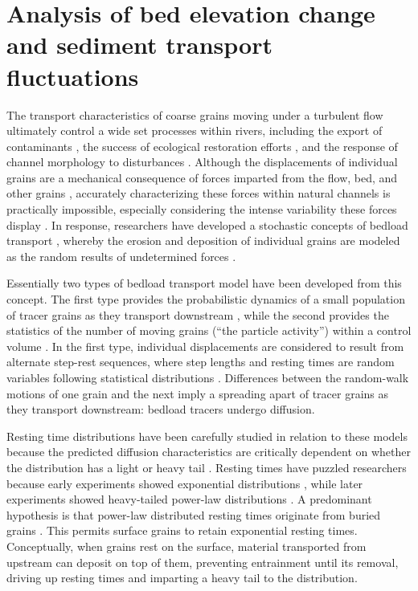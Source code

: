 
\chapter{Analysis of bed elevation change and sediment transport fluctuations}
\label{ch:ch3}

The transport characteristics of coarse grains moving under a turbulent flow ultimately control a wide set processes within rivers, including the export of contaminants \citep{Malmon2005,Macklin2006}, the success of ecological restoration efforts \citep{Gaeuman2017}, and the response of channel morphology to disturbances \citep{Hassan2017}.
Although the displacements of individual grains are a mechanical consequence of forces imparted from the flow, bed, and other grains \citep{Wiberg1985, Vowinckel2014,Gonzalez2017}, accurately characterizing these forces within natural channels is practically impossible, especially considering the intense variability these forces display \citep{Schmeeckle2007,Celik2010, Dwivedi2011}.
In response, researchers have developed a stochastic concepts of bedload transport \citep{Einstein1937}, whereby the erosion and deposition of individual grains are modeled as the random results of undetermined forces \citep{Einstein1950,Paintal1971,Ancey2006}.

Essentially two types of bedload transport model have been developed from this concept.
The first type provides the probabilistic dynamics of a small population of tracer grains as they transport downstream \citep{Einstein1937,Hubbell1964, Nakagawa1976,Martin2012,Lajeunesse2017,Wu2019}, while the second provides the statistics of the number of moving grains (``the particle activity'') within a control volume \citep{Einstein1950,Ancey2006,Furbish2012a}.
In the first type, individual displacements are considered to result from alternate step-rest sequences, where step lengths and resting times are random variables following statistical distributions \citep{Einstein1937}. 
Differences between the random-walk motions of one grain and the next imply a spreading apart of tracer grains as they transport downstream: bedload tracers undergo diffusion.

Resting time distributions have been carefully studied in relation to these models because the predicted diffusion characteristics are critically dependent on whether the distribution has a light or heavy tail \citep{Bradley2017,Martin2012,Weeks1998}.
Resting times have puzzled researchers because early experiments showed exponential distributions \citep{Einstein1937,Hubbell1964, Yano1969,Nakagawa1976}, while later experiments showed heavy-tailed power-law distributions \citep{Martin2012,Voepel2013, Olinde2015, Pretzlav2016a, Bradley2017, Liu2019}.
A predominant hypothesis is that power-law distributed resting times originate from buried grains \citep{Martin2014,Voepel2013}. This permits surface grains to retain exponential resting times. 
Conceptually, when grains rest on the surface, material transported from upstream can deposit on top of them, preventing entrainment until its removal, driving up resting times and imparting a heavy tail to the distribution.

